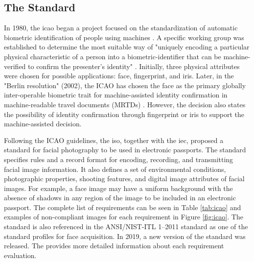 \subsection{The \icao Standard}

In 1980, the \acf{icao} began a project focused on the standardization of automatic biometric identification of people using machines \citep{icao2003report}. A specific working group was established to determine the most suitable way of "uniquely encoding a particular physical characteristic of a person into a biometric-identifier that can be machine-verified to confirm the presenter's identity" \citep{icao2003report}. Initially, three physical attributes were chosen for possible applications: face, fingerprint, and iris. Later, in the "Berlin resolution" (2002), the ICAO has chosen the face as the primary globally inter-operable biometric trait for machine-assisted identity confirmation in machine-readable travel documents (MRTDs) \citep{ferrara2012face}. However, the decision also states the possibility of identity confirmation through fingerprint or iris to support the machine-assisted decision.

Following the ICAO guidelines, the \acf{iso}, together with the \acf{iec}, proposed a standard for facial photography to be used in electronic passports. The \icao \citep{iso-iec} standard specifies rules and a record format for encoding, recording, and transmitting facial image information. It also defines a set of environmental conditions, photographic properties, shooting features, and digital image attributes of facial images. For example, a face image may have a uniform background with the absence of shadows in any region of the image to be included in an electronic passport. The complete list of requirements can be seen in Table \ref{tab:icao} and examples of non-compliant images for each requirement in Figure \ref{fig:icao}. The \icao standard is also referenced in the ANSI/NIST-ITL 1–2011 standard \citep{nist2011} as one of the standard profiles for face acquisition. In 2019, a new version of the \icao standard was released. The \icaonew provides more detailed information about each requirement evaluation.



